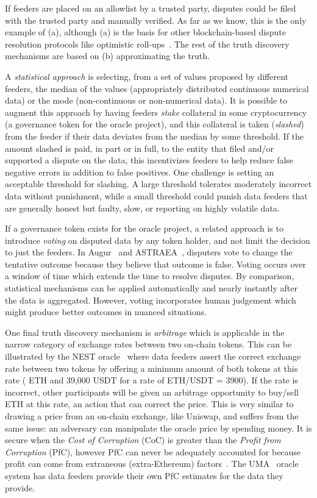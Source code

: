 If feeders are placed on an allowlist by a trusted party, disputes could be filed with the trusted party and manually verified. As far as we know, this is the only example of (a), although (a) is the basis for other blockchain-based dispute resolution protocols like optimistic roll-ups~\cite{KGCWF18}. The rest of the truth discovery mechanisms are based on (b) approximating the truth. 

A \textit{statistical approach} is selecting, from a set of values proposed by different feeders, the median of the values (\eg appropriately distributed continuous numerical data) or the mode (\eg non-continuous or non-numerical data). It is possible to augment this approach by having feeders \textit{stake} collateral in some cryptocurrency (\eg a governance token for the oracle project), and this collateral is taken (\textit{slashed}) from the feeder if their data deviates from the median by some threshold. If the amount slashed is paid, in part or in full, to the entity that filed and/or supported a dispute on the data, this incentivizes feeders to help reduce false negative errors in addition to false positives. One challenge is setting an acceptable threshold for slashing. A large threshold tolerates moderately incorrect data without punishment, while a small threshold could punish data feeders that are generally honest but faulty, slow, or reporting on highly volatile data. 

If a governance token exists for the oracle project, a related approach is to introduce \textit{voting} on disputed data by any token holder, and not limit the decision to just the feeders. In Augur~\cite{peterson2015augur} and ASTRAEA~\cite{adler2018astraea}, disputers vote to change the tentative outcome because they believe that outcome is false. Voting occurs over a window of time which extends the time to resolve disputes. By comparison, statistical mechanisms can be applied automatically and nearly instantly after the data is aggregated. However, voting incorporates human judgement which might produce better outcomes in nuanced situations.

One final truth discovery mechanism is \textit{arbitrage} which is applicable in the narrow category of exchange rates between two on-chain tokens. This can be illustrated by the NEST oracle~\cite{nestwhitepaper} where data feeders assert the correct exchange rate between two tokens by offering a minimum amount of both tokens at this rate ( ETH and 39,000 USDT for a rate of ETH/USDT = 3900). If the rate is incorrect, other participants will be given an arbitrage opportunity to buy/sell ETH at this rate, an action that can correct the price. This is very similar to drawing a price from an on-chain exchange, like Uniswap, and suffers from the same issue: an adversary can manipulate the oracle price by spending money. It is secure when the \textit{Cost of Corruption} (CoC) is greater than the \textit{Profit from Corruption} (PfC), however PfC can never be adequately accounted for because profit can come from extraneous (extra-Ethereum) factors~\cite{FoBo19}. The UMA~\cite{lambur2019data} oracle system has data feeders provide their own PfC estimates for the data they provide. 

